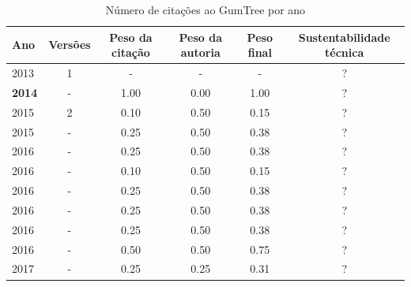 \begin{table}[H]
\caption{Número de citações ao GumTree por ano}
\centering
\begin{tabular}{| l | c | c | c | c | c |}
  \hline
  Ano & Versões & Peso da citação & Peso da autoria & Peso final & Sustentabilidade técnica \\
  \hline
        2013 & 1 & - & - & - & ? \\
\hline
            {\bf 2014}
          &
          -
          &
          1.00
          &
          0.00
          &
            {\color{blue} 1.00}
          &
          ?
          \\
\hline
            2015
          &
          2
          &
          0.10
          &
          0.50
          &
            {\color{red} 0.15}
          &
          ?
          \\
            2015
          &
          -
          &
          0.25
          &
          0.50
          &
            {\color{red} 0.38}
          &
          ?
          \\
\hline
            2016
          &
          -
          &
          0.25
          &
          0.50
          &
            {\color{red} 0.38}
          &
          ?
          \\
            2016
          &
          -
          &
          0.10
          &
          0.50
          &
            {\color{red} 0.15}
          &
          ?
          \\
            2016
          &
          -
          &
          0.25
          &
          0.50
          &
            {\color{red} 0.38}
          &
          ?
          \\
            2016
          &
          -
          &
          0.25
          &
          0.50
          &
            {\color{red} 0.38}
          &
          ?
          \\
            2016
          &
          -
          &
          0.25
          &
          0.50
          &
            {\color{red} 0.38}
          &
          ?
          \\
            2016
          &
          -
          &
          0.50
          &
          0.50
          &
            {\color{blue} 0.75}
          &
          ?
          \\
\hline
            2017
          &
          -
          &
          0.25
          &
          0.25
          &
            {\color{red} 0.31}
          &
          ?
          \\

\end{tabular}
\end{table}
